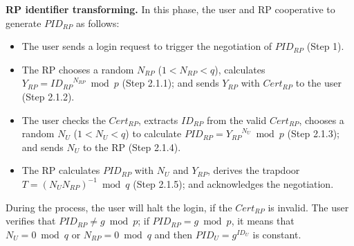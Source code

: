 \vspace{1mm}\noindent\textbf{RP identifier transforming.}
In this phase, the user and RP cooperative to generate $PID_{RP}$ as follows:
\begin{itemize}
  \item The user sends a login request to trigger the negotiation of $PID_{RP}$ (Step 1).
  \item The RP chooses a random $N_{RP}$ ($1 < N_{RP} <q$), calculates $Y_{RP}={ID_{RP}}^{N_{RP}} \bmod p$ (Step 2.1.1);
   and sends $Y_{RP}$ with $Cert_{RP}$  to the user (Step 2.1.2).
  \item The user checks the $Cert_{RP}$, extracts $ID_{RP}$ from the valid $Cert_{RP}$, chooses a random $N_U$ ($1 < N_U <q$) to calculate $PID_{RP}={Y_{RP}}^{N_{U}} \bmod p$ (Step 2.1.3); and sends $N_U$ %
       to the RP (Step 2.1.4).
  \item The RP calculates $PID_{RP}$ with $N_U$ and $Y_{RP}$, %
   derives the trapdoor $T={(N_U N_{RP})}^{-1} \bmod q$ (Step 2.1.5); and 
   acknowledges the negotiation.
\end{itemize}
During the process, the user will halt the login, if  the $Cert_{RP}$ is invalid.
The user verifies that $PID_{RP} \neq g \bmod p$;
    if $PID_{RP} = g \bmod p$, it means that $N_U = 0 \bmod q$ or $N_{RP} = 0 \bmod q$
        and then $PID_U = {g}^{ID_U}$ is constant.

